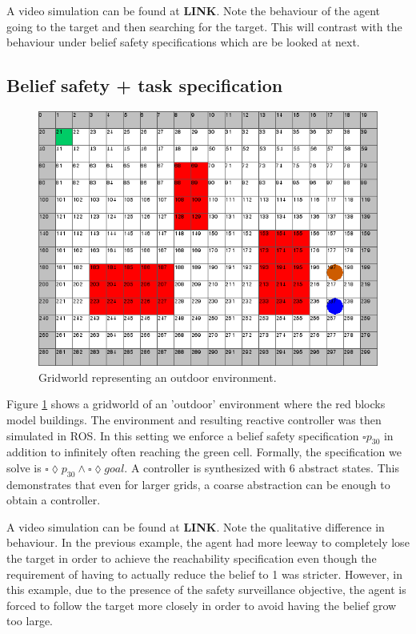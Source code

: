  A video simulation can be found at \textbf{LINK}. Note the behaviour of the agent going to the target and then searching for the target. This will contrast with the behaviour under belief safety specifications which are be looked at next. 

\subsection{Belief safety + task specification}
\begin{figure}
\centering
\includegraphics[scale=0.3]{case2.png}\caption{Gridworld representing an outdoor environment.}\label{fig:case2}
\vspace{-.5cm}
\end{figure}
Figure \ref{fig:case2} shows a gridworld of an 'outdoor' environment where the red blocks model buildings. The environment and resulting reactive controller was then simulated in ROS.
In this setting we enforce a belief safety specification $\square p_{30}$ in addition to infinitely often reaching the green cell. Formally, the specification we solve is $\square \lozenge p_{30} \wedge \square \lozenge goal$. 
A controller is synthesized with 6 abstract states. This demonstrates that even for larger grids, a coarse abstraction can be enough to obtain a controller.
 
 A video simulation can be found at \textbf{LINK}. Note the qualitative difference in behaviour. In the previous example, the agent had more leeway to completely lose the target in order to achieve the reachability specification even though the requirement of having to actually reduce the belief to 1 was stricter. However, in this example, due to the presence of the safety surveillance objective, the agent is forced to follow the target more closely in order to avoid having the belief grow too large. 
